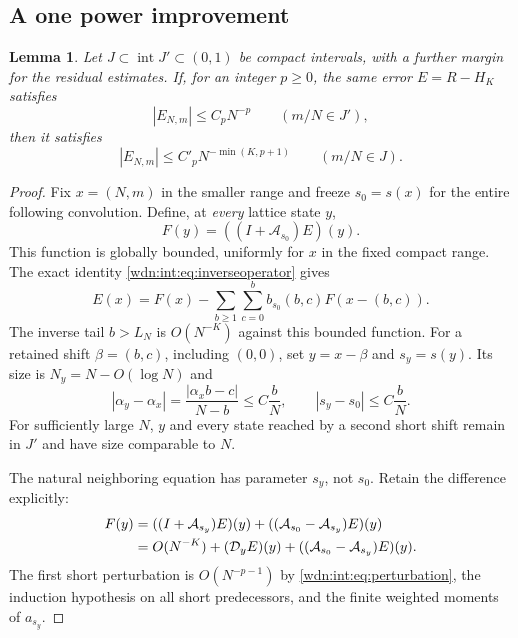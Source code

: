 \documentclass[11pt,letterpaper]{article}
\newtheorem{lemma}[theorem]{Lemma}
\theoremstyle{remark}\newtheorem{remark}[theorem]{Remark}
\begin{document}
\subsection{A one power improvement}
\begin{lemma}\label{wdn:int:lem:improvement}
Let $J\subset\operatorname{int}J'\subset(0,1)$ be compact intervals,
with a further margin for the residual estimates. If, for an integer
$p\ge0$, the same error $E=R-H_K$ satisfies
\[
 |E_{N,m}|\le C_pN^{-p}\qquad(m/N\in J'),
\]
then it satisfies
\begin{equation}\label{wdn:int:eq:improvement}
 |E_{N,m}|\le C'_pN^{-\min(K,p+1)}\qquad(m/N\in J).
\end{equation}
\end{lemma}
\begin{proof}
Fix $x=(N,m)$ in the smaller range and freeze $s_0=s(x)$ for the
entire following convolution. Define, at \emph{every} lattice state $y$,
\[
 F(y)=((I+\mathcal A_{s_0})E)(y).
\]
This function is globally bounded, uniformly for $x$ in the fixed compact
range. The exact identity \eqref{wdn:int:eq:inverseoperator} gives
\begin{equation}\label{wdn:int:eq:frozenatbase}
 E(x)=F(x)-\sum_{b\ge1}\sum_{c=0}^b
                       b_{s_0}(b,c)F(x-(b,c)).
\end{equation}
The inverse tail $b>L_N$ is $O(N^{-K})$ against this bounded function.
For a retained shift $\beta=(b,c)$, including $(0,0)$, set
$y=x-\beta$ and $s_y=s(y)$. Its size is $N_y=N-O(\log N)$ and
\begin{equation}\label{wdn:int:eq:drift}
 |\alpha_y-\alpha_x|
 =\frac{|\alpha_xb-c|}{N-b}\le C\frac bN,
 \qquad |s_y-s_0|\le C\frac bN.
\end{equation}
For sufficiently large $N$, $y$ and every state reached by a second short
shift remain in $J'$ and have size comparable to $N$.

The natural neighboring equation has parameter $s_y$, not $s_0$.
Retain the difference explicitly:
\begin{align}
 F(y)
 &=((I+\mathcal A_{s_y})E)(y)
                  +((\mathcal A_{s_0}-\mathcal A_{s_y})E)(y)\notag\\
 &=O(N^{-K})+(\mathcal D_yE)(y)
                  +((\mathcal A_{s_0}-\mathcal A_{s_y})E)(y).
 \label{wdn:int:eq:neighbor}
\end{align}
The first short perturbation is $O(N^{-p-1})$ by
\eqref{wdn:int:eq:perturbation}, the induction hypothesis on all short
predecessors, and the finite weighted moments of $a_{s_y}$.


\end{proof}
\end{document}
